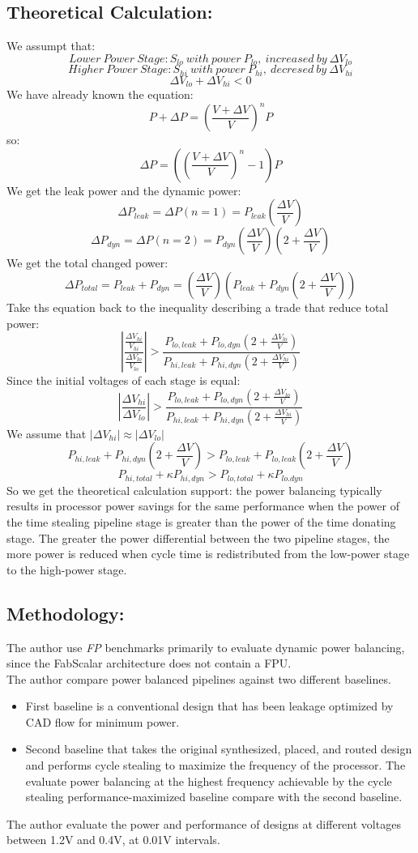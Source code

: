\documentclass{article}
\begin{document}
\subsection{Theoretical Calculation:}
We assumpt that:
$$Lower\ Power\ Stage: S_{lo}\ with\ power\ P_{lo},\ increased\ by\ \Delta V_{lo}$$
$$Higher\ Power\ Stage: S_{hi}\ with\ power\ P_{hi},\ decresed\ by\ \Delta V_{hi}$$
$$\Delta V_{lo} + \Delta V_{hi} < 0 $$
We have already known the equation:
$$P + \Delta P = (\frac{V + \Delta V}{V})^n P$$
so:
$$\Delta P = ((\frac{V + \Delta V}{V})^n - 1) P$$
We get the leak power and the dynamic power:
$$\Delta P_{leak} = \Delta P(n = 1) = P_{leak}(\frac{\Delta V}{V})$$
$$\Delta P_{dyn} = \Delta P(n = 2) = P_{dyn}(\frac{\Delta V}{V})(2+\frac{\Delta V}{V})$$
We get the total changed power:
$$\Delta P_{total} = P_{leak} + P_{dyn} = (\frac{\Delta V}{V})(P_{leak} + P_{dyn}(2+\frac{\Delta V}{V}))$$
Take ths equation back to the inequality describing a trade that reduce total power:
$$\left\lvert \frac{\frac{\Delta V_{hi}}{V_{hi}}}{\frac{\Delta V_{lo}}{V_{lo}}}\right\rvert > \frac{P_{lo, leak}+P_{lo,dyn}(2+\frac{\Delta V_{lo}}{V})}{P_{hi, leak}+P_{hi,dyn}(2+\frac{\Delta V_{hi}}{V})}$$
Since the initial voltages of each stage is equal:
$$\left\lvert \frac{\Delta V_{hi}}{\Delta V_{lo}}\right\rvert > \frac{P_{lo, leak}+P_{lo,dyn}(2+\frac{\Delta V_{lo}}{V})}{P_{hi, leak}+P_{hi,dyn}(2+\frac{\Delta V_{hi}}{V})}$$
We assume that $\left\lvert \Delta V_{hi}\right\rvert \approx \left\lvert \Delta V_{lo}\right\rvert $
$$P_{hi,leak} + P_{hi,dyn}(2+\frac{\Delta V}{V}) > P_{lo, leak} + P_{lo, leak}(2+\frac{\Delta V}{V})$$
$$P_{hi,total} + \kappa P_{hi,dyn} > P_{lo,total} + \kappa P_{lo.dyn}$$
So we get the theoretical calculation support: the power balancing typically results in processor power savings for the same performance when the power of the time stealing pipeline stage is greater than the power of the time donating stage. The greater the
power differential between the two pipeline stages, the more power is reduced when cycle time is redistributed from the low-power stage to the high-power stage.
\subsection{Methodology:}
The author use \emph{FP} benchmarks primarily to evaluate dynamic power balancing, since the FabScalar architecture does not contain a FPU.\\
The author compare power balanced pipelines against two different baselines. 
\begin{itemize}
    \item First baseline is a conventional design that has been leakage optimized by CAD flow for minimum power. 
    \item Second baseline that takes the original synthesized, placed, and routed design and performs cycle stealing to maximize the frequency of the processor. The evaluate power balancing at the highest frequency achievable by the cycle stealing performance-maximized baseline compare with the second baseline.
\end{itemize}
The author evaluate the power and performance of designs at different voltages between 1.2V and 0.4V, at 0.01V intervals.
\end{document}
